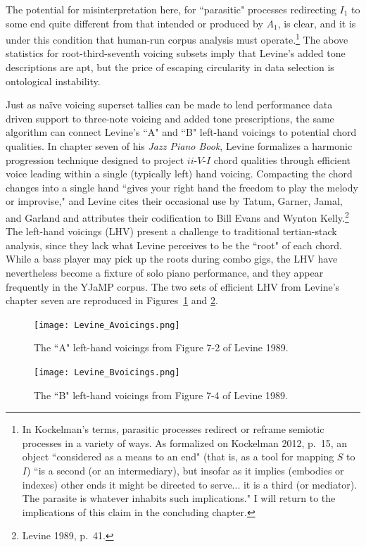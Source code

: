 The potential for misinterpretation here, for ``parasitic" processes redirecting $I_1$ to some end quite different from that intended or produced by $A_1$, is clear, and it is under this condition that human-run corpus analysis must operate.\footnote{In Kockelman's terms, parasitic processes redirect or reframe semiotic processes in a variety of ways.  As formalized on Kockelman 2012, p.\ 15, an object ``considered as a means to an end" (that is, as a tool for mapping $S$ to $I$) ``is a second (or an intermediary), but insofar as it implies (embodies or indexes) other ends it might be directed to serve... it is a third (or mediator).  The parasite is whatever inhabits such implications."  I will return to the implications of this claim in the concluding chapter.}  The above statistics for root-third-seventh voicing subsets imply that Levine's added tone descriptions are apt, but the price of escaping circularity in data selection is ontological instability.

Just as na\"{i}ve voicing superset tallies can be made to lend performance data driven support to three-note voicing and added tone prescriptions, the same algorithm can connect Levine's ``A" and ``B" left-hand voicings to potential chord qualities.  In chapter seven of his \emph{Jazz Piano Book}, Levine formalizes a harmonic progression technique designed to project $ii$-$V$-$I$ chord qualities through efficient voice leading within a single (typically left) hand voicing.  Compacting the chord changes into a single hand ``gives your right hand the freedom to play the melody or improvise," and Levine cites their occasional use by Tatum, Garner, Jamal, and Garland and attributes their codification to Bill Evans and Wynton Kelly.\footnote{Levine 1989, p.\ 41.}  The left-hand voicings (LHV) present a challenge to traditional tertian-stack analysis, since they lack what Levine perceives to be the ``root" of each chord.  While a bass player may pick up the roots during combo gigs, the LHV have nevertheless become a fixture of solo piano performance, and they appear frequently in the YJaMP corpus.  The two sets of efficient LHV from Levine's chapter seven are reproduced in Figures~\ref{levine_Avcg} and \ref{levine_Bvcg}.

\begin{figure}%
	\centering
	\texttt{[image: Levine\_Avoicings.png]}
	\caption{The ``A" left-hand voicings from Figure 7-2 of Levine 1989.}
	\label{levine_Avcg}
\end{figure}
\begin{figure}%
	\centering
	\texttt{[image: Levine\_Bvoicings.png]}
	\caption{The ``B" left-hand voicings from Figure 7-4 of Levine 1989.}
	\label{levine_Bvcg}
\end{figure}

